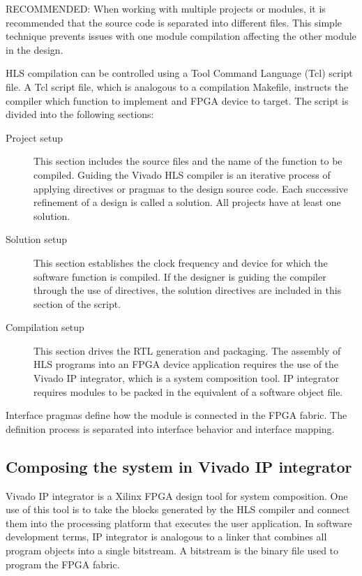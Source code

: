 \begin{highlight}
  RECOMMENDED: When working with multiple projects or modules, it is recommended that the source
  code is separated into different files. This simple technique prevents issues with one module
  compilation affecting the other module in the design.
\end{highlight}

HLS compilation can be controlled using a Tool Command Language (Tcl) script file. A Tcl
script file, which is analogous to a compilation Makefile, instructs the compiler which
function to implement and FPGA device to target. The script is divided into the following sections:

\begin{description}
  \item[Project setup] This section includes the source files and the name of the function to be compiled.
  Guiding the Vivado HLS compiler is an iterative process of applying directives or
  pragmas to the design source code. Each successive refinement of a design is called a
  solution. All projects have at least one solution.
  \item[Solution setup] This section establishes the clock frequency and device for which the software function
  is compiled. If the designer is guiding the compiler through the use of directives, the
  solution directives are included in this section of the script.
  \item[Compilation setup] This section drives the RTL generation and packaging. The assembly of HLS programs
  into an FPGA device application requires the use of the Vivado IP
  integrator, which is a system composition tool. IP integrator requires modules to be
  packed in the equivalent of a software object file.
\end{description}

Interface pragmas define how the module is connected in the FPGA fabric. The definition
process is separated into interface behavior and interface mapping.

\subsection{Composing the system in Vivado IP integrator}
Vivado IP integrator is a Xilinx FPGA design tool for system composition. One use of this
tool is to take the blocks generated by the HLS compiler and connect them into the
processing platform that executes the user application. In software development terms, IP
integrator is analogous to a linker that combines all program objects into a single bitstream.
A bitstream is the binary file used to program the FPGA fabric.

